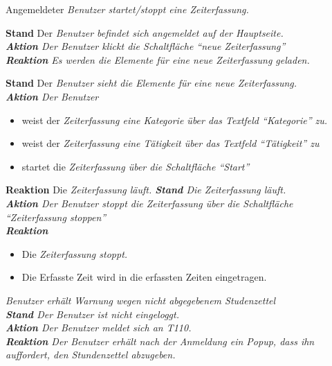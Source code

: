 \begin{requirements}
\begin{requirements}
	\end{requirements}
	 Angemeldeter \em{Benutzer} startet/stoppt eine \em{Zeiterfassung}.
	\begin{requirements}
            \textbf{Stand} Der \em{Benutzer} befindet sich angemeldet auf der \em{Hauptseite}. \\
            \textbf{Aktion} Der \em{Benutzer} klickt die Schaltfläche "`neue Zeiterfassung"' \\
            \textbf{Reaktion} Es werden die Elemente für eine neue \em{Zeiterfassung} geladen.
            \item
                \textbf{Stand} Der \em{Benutzer} sieht die Elemente für eine neue \em{Zeiterfassung}. \\
                \textbf{Aktion} Der \em{Benutzer}
                    \begin{itemize}
                        \item weist der \em{Zeiterfassung} eine \em{Kategorie} über das Textfeld "`Kategorie"' zu.
                        \item weist der \em{Zeiterfassung} eine \em{Tätigkeit} über das Textfeld "`Tätigkeit"' zu
                        \item startet die \em{Zeiterfassung} über die Schaltfläche "`Start"'
                    \end{itemize}
                \textbf{Reaktion} Die \em{Zeiterfassung} läuft.
            \textbf{Stand} Die \em{Zeiterfassung} läuft. \\
            \textbf{Aktion} Der \em{Benutzer} stoppt die \em{Zeiterfassung} über die Schaltfläche "`Zeiterfassung stoppen"' \\
            \textbf{Reaktion}
                \begin{itemize}
                    \item Die \em{Zeiterfassung} stoppt.
                    \item Die Erfasste Zeit wird in die erfassten Zeiten eingetragen.
                \end{itemize}
	\end{requirements}


	 \em{Benutzer} erhält \em{Warnung} wegen nicht abgegebenem \em{Studenzettel} \\
        \textbf{Stand} Der \em{Benutzer} ist nicht eingeloggt. \\
        \textbf{Aktion} Der \em{Benutzer} meldet sich an \em{T110}. \\
        \textbf{Reaktion} Der \em{Benutzer} erhält nach der Anmeldung ein Popup, dass ihn auffordert, den \em{Stundenzettel} abzugeben.


\end{requirements}
